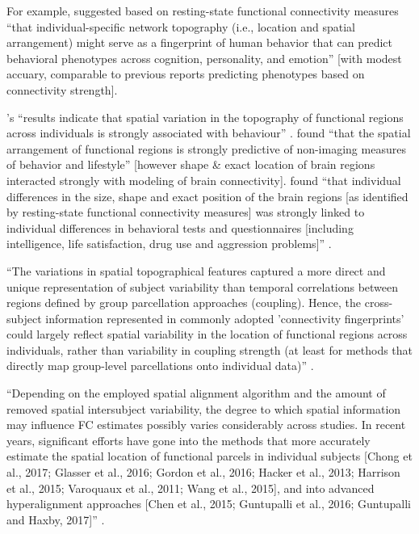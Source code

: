 %
For example, \citet{kong2019spatial} suggested based on resting-state functional
connectivity measures ``that individual-specific network topography (i.e.,
location and spatial arrangement) might serve as a fingerprint of human behavior
that can predict behavioral phenotypes across cognition, personality, and
emotion'' \citep{kong2019spatial} [with modest accuary, comparable to previous
reports predicting phenotypes based on connectivity strength].

%
\citep{bijsterbosch2018relationship}'s ``results indicate that spatial variation
in the topography of functional regions across individuals is strongly
associated with behaviour'' \citep{bijsterbosch2018relationship}.
%
\citet{bijsterbosch2018relationship} found ``that the spatial arrangement of
functional regions is strongly predictive of non-imaging measures of behavior
and lifestyle'' [however shape \& exact location of brain regions interacted
strongly with  modeling of brain connectivity].
%
\citet{bijsterbosch2018relationship} found ``that individual differences in the
size, shape and exact position of the brain regions [as identified by
resting-state functional connectivity measures] was strongly linked to
individual differences in behavioral tests and questionnaires [including
intelligence, life satisfaction, drug use and aggression problems]''
\citep{bijsterbosch2018relationship}.

%
``The variations in spatial topographical features captured a more direct and
unique representation of subject variability than temporal correlations between
regions defined by group parcellation approaches (coupling).
%
Hence, the cross-subject information represented in commonly adopted
'connectivity fingerprints' could largely reflect spatial variability in the
location of functional regions across individuals, rather than variability in
coupling strength (at least for methods that directly map group-level
parcellations onto individual data)'' \citep{bijsterbosch2018relationship}.

%
``Depending on the employed spatial alignment algorithm and the amount of
removed spatial intersubject variability, the degree to which spatial
information may influence FC estimates possibly varies considerably across
studies.
%
In recent years, significant efforts have gone into the methods that more
accurately estimate the spatial location of functional parcels in individual
subjects [Chong et al., 2017; Glasser et al., 2016; Gordon et al., 2016; Hacker
et al., 2013; Harrison et al., 2015; Varoquaux et al., 2011; Wang et al., 2015],
and into advanced hyperalignment approaches [Chen et al., 2015; Guntupalli et
al., 2016; Guntupalli and Haxby, 2017]'' \citep{bijsterbosch2018relationship}.
